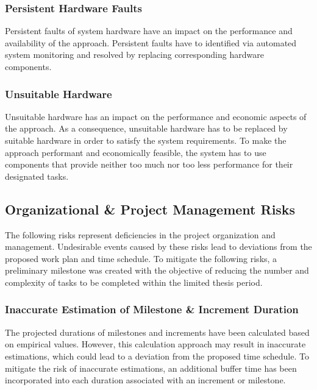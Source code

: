\subsubsection{Persistent Hardware Faults}
Persistent faults of system hardware have an impact on the performance and availability of the approach.
Persistent faults have to identified via automated system monitoring and resolved by replacing corresponding hardware components.

\subsubsection{Unsuitable Hardware}
Unsuitable hardware has an impact on the performance and economic aspects of the approach.
As a consequence, unsuitable hardware has to be replaced by suitable hardware in order to satisfy the system requirements.
To make the approach performant and economically feasible, the system has to use components that provide neither too much nor too less performance for their designated tasks.


\subsection{Organizational \& Project Management Risks}
\label{sec:risk_assessment_project_management}
The following risks represent deficiencies in the project organization and management.
Undesirable events caused by these risks lead to deviations from the proposed work plan and time schedule.
To mitigate the following risks, a preliminary milestone was created with the objective of reducing the number and complexity of tasks to be completed within the limited thesis period.

\subsubsection{Inaccurate Estimation of Milestone \& Increment Duration}
The projected durations of milestones and increments have been calculated based on empirical values.
However, this calculation approach may result in inaccurate estimations, which could lead to a deviation from the proposed time schedule.
To mitigate the risk of inaccurate estimations, an additional buffer time has been incorporated into each duration associated with an increment or milestone.

